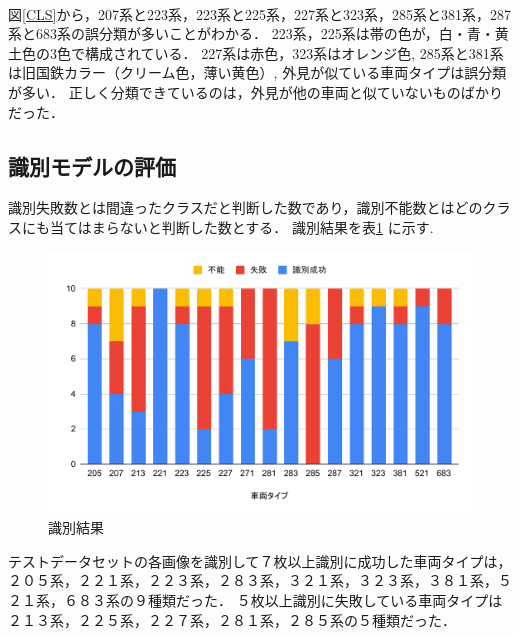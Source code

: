 \\
図\ref{CLS}から，207系と223系，223系と225系，227系と323系，285系と381系，287系と683系の誤分類が多いことがわかる．
223系，225系は帯の色が，白・青・黄土色の3色で構成されている．
227系は赤色，323系はオレンジ色,
285系と381系は旧国鉄カラー（クリーム色，薄い黄色）,
外見が似ている車両タイプは誤分類が多い．
正しく分類できているのは，外見が他の車両と似ていないものばかりだった．



\subsection{識別モデルの評価}
識別失敗数とは間違ったクラスだと判断した数であり，識別不能数とはどのクラスにも当てはまらないと判断した数とする．
識別結果を表\ref{fig:chartdet} に示す.\\
\begin{figure}[H]
	\centering
	\includegraphics[width=0.7\linewidth]{chap4/fig/chartDET}
	\caption[識別結果]{識別結果}
	\label{fig:chartdet}
\end{figure}


テストデータセットの各画像を識別して７枚以上識別に成功した車両タイプは，２０５系，２２１系，２２３系，２８３系，３２１系，３２３系，３８１系，５２１系，６８３系の９種類だった．
５枚以上識別に失敗している車両タイプは２１３系，２２５系，２２７系，２８１系，２８５系の５種類だった．

